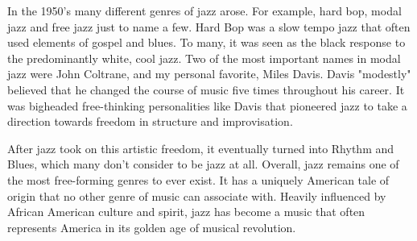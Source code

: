\documentclass[12pt]{article}
\begin{document}
In the 1950's many different genres of jazz arose. For example, hard bop, modal
jazz and free jazz just to name a few. Hard Bop was a slow tempo jazz that often
used elements of gospel and blues. To many, it was seen as the black response to
the predominantly white, cool jazz. Two of the most important names in modal
jazz were John Coltrane, and my personal favorite, Miles Davis. Davis "modestly"
believed that he changed the course of music five times throughout his career.
It  was bigheaded free-thinking personalities like Davis that pioneered jazz to
take a direction towards freedom in structure and improvisation.

After jazz took on this artistic freedom, it eventually turned into Rhythm and
Blues, which many don't consider to be jazz at all. Overall, jazz remains one of
the most free-forming genres to ever exist. It has a uniquely American tale of
origin that no other genre of music can associate with. Heavily influenced by
African American culture and spirit, jazz has become a music that often
represents America in its golden age of musical revolution.
\end{document}
